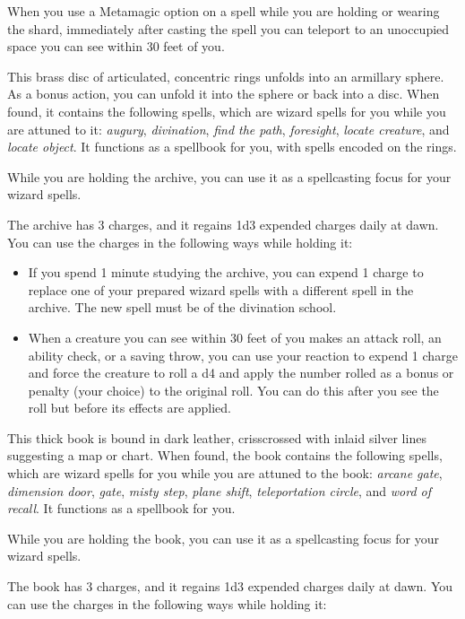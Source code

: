 \documentclass[10pt,a4paper,twoside,bg=print,twocolumn,openany,nodeprecatedcode]{dndbook}
\begin{document}
When you use a Metamagic option on a spell while you are holding or wearing the shard, immediately after casting the spell you can teleport to an unoccupied space you can see within 30 feet of you.

This brass disc of articulated, concentric rings unfolds into an armillary sphere. As a bonus action, you can unfold it into the sphere or back into a disc. When found, it contains the following spells, which are wizard spells for you while you are attuned to it: \textit{augury}, \textit{divination}, \textit{find the path}, \textit{foresight}, \textit{locate creature}, and \textit{locate object}. It functions as a spellbook for you, with spells encoded on the rings.

While you are holding the archive, you can use it as a spellcasting focus for your wizard spells.

The archive has 3 charges, and it regains 1d3 expended charges daily at dawn. You can use the charges in the following ways while holding it:


\begin{itemize}
\item If you spend 1 minute studying the archive, you can expend 1 charge to replace one of your prepared wizard spells with a different spell in the archive. The new spell must be of the divination school.
\item When a creature you can see within 30 feet of you makes an attack roll, an ability check, or a saving throw, you can use your reaction to expend 1 charge and force the creature to roll a d4 and apply the number rolled as a bonus or penalty (your choice) to the original roll. You can do this after you see the roll but before its effects are applied.
\end{itemize}

This thick book is bound in dark leather, crisscrossed with inlaid silver lines suggesting a map or chart. When found, the book contains the following spells, which are wizard spells for you while you are attuned to the book: \textit{arcane gate}, \textit{dimension door}, \textit{gate}, \textit{misty step}, \textit{plane shift}, \textit{teleportation circle}, and \textit{word of recall}. It functions as a spellbook for you.

While you are holding the book, you can use it as a spellcasting focus for your wizard spells.

The book has 3 charges, and it regains 1d3 expended charges daily at dawn. You can use the charges in the following ways while holding it:
\end{document}
